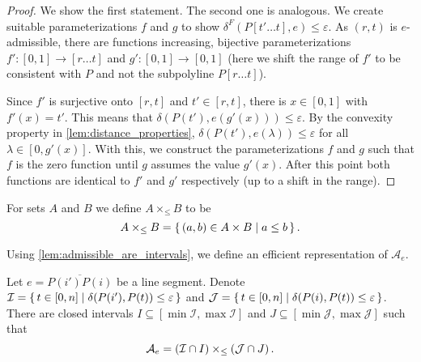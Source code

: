\begin{proof}
	We show the first statement. The second one is analogous. We create suitable parameterizations \(f\) and \(g\) to show \(\delta^F(P[t' \dots t], e) \leq \varepsilon\). As \((r,t)\) is \(e\)-admissible, there are functions increasing, bijective parameterizations \(f':[0,1] \to [r \dots t]\) and \(g':[0,1] \to [0,1]\) (here we shift the range of \(f'\) to be consistent with \(P\) and not the subpolyline \(P[r \dots t]\)).

	Since \(f'\) is surjective onto \([r, t]\) and \(t' \in [r, t]\), there is \(x \in [0, 1]\) with \(f'(x) = t'\). This means that \(\delta(P(t'), e(g'(x))) \leq \varepsilon\). By the convexity property in \cref{lem:distance_properties}, \(\delta(P(t'), e(\lambda)) \leq \varepsilon\) for all \(\lambda \in [0, g'(x)]\). With this, we construct the parameterizations \(f\) and \(g\) such that \(f\) is the zero function until \(g\) assumes the value \(g'(x)\). After this point both functions are identical to \(f'\) and \(g'\) respectively (up to a shift in the range).
\end{proof}

\begin{definition}
	For sets \(A\) and \(B\) we define \(A \times_{\leq} B\) to be 
		\[A \times_{\leq} B = \set{(a, b) \in A \times B \mid a \leq b}.\]
\end{definition}

Using \cref{lem:admissible_are_intervals}, we define an efficient representation of \(\mathcal{A}_e\).

\begin{lemma}\label{lem:admissible-rep-1}
	Let \(e = \overline{P(i')P(i)}\) be a line segment. Denote \(\mathcal{I} = \set{t \in [0,n] \mid \delta(P(i'), P(t)) \leq \varepsilon}\) and \(\mathcal{J} = \set{t \in [0,n] \mid \delta(P(i), P(t)) \leq \varepsilon}\). There are closed intervals \(I \subseteq [\min \mathcal{I}, \max \mathcal{I}]\) and \(J \subseteq [\min \mathcal{J}, \max \mathcal{J}]\) such that 
	\[\mathcal{A}_e = \left(\mathcal{I} \cap I\right) \times_\leq \left(\mathcal{J} \cap J\right).\]
\end{lemma}

